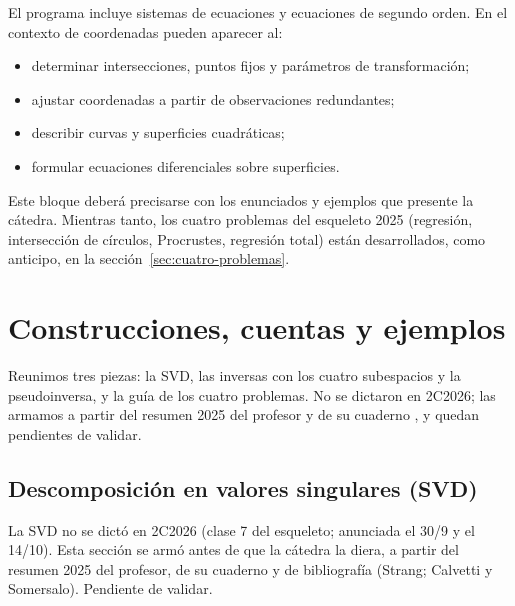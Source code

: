 El programa incluye sistemas de ecuaciones y ecuaciones de segundo orden. En el contexto de
coordenadas pueden aparecer al:
\begin{itemize}
  \item determinar intersecciones, puntos fijos y parámetros de transformación;
  \item ajustar coordenadas a partir de observaciones redundantes;
  \item describir curvas y superficies cuadráticas;
  \item formular ecuaciones diferenciales sobre superficies.
\end{itemize}

Este bloque deberá precisarse con los enunciados y ejemplos que presente la cátedra. Mientras tanto, los cuatro problemas del esqueleto 2025 (regresión, intersección de círculos, Procrustes, regresión total) están desarrollados, como anticipo, en la sección~\ref{sec:cuatro-problemas}.

\section{Construcciones, cuentas y ejemplos}

Reunimos tres piezas: la SVD, las inversas con los cuatro subespacios y la pseudoinversa, y la guía de los cuatro problemas. No se dictaron en 2C2026; las armamos a partir del resumen 2025 del profesor y de su cuaderno , y quedan pendientes de validar.

\subsection{Descomposición en valores singulares (SVD)}\label{sec:svd}

{\small\vspace{1mm}\par}
{\small\vspace{1mm}\par}


\begin{atencion}[Anticipado]
La SVD no se dictó en 2C2026 (clase 7 del esqueleto; anunciada el 30/9 y el 14/10). Esta
sección se armó antes de que la cátedra la diera, a partir del resumen 2025 del profesor,
de su cuaderno  y de bibliografía (Strang; Calvetti y Somersalo).
Pendiente de validar.
\end{atencion}

